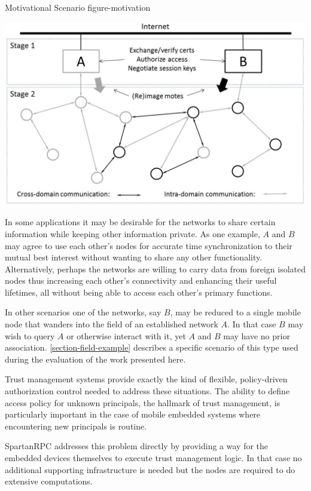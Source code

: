 \begin{fpfig*}[t]
  {Motivational Scenario}
  {figure-motivation}
  \begin{center}
    \includegraphics[scale=.40]{Figures/spartanrpc.eps}
  \end{center}
\end{fpfig*}

In some applications it may be desirable for the networks to share certain information while
keeping other information private. As one example, $A$ and $B$ may agree to use each other's
nodes for accurate time synchronization to their mutual best interest without wanting to share
any other functionality. Alternatively, perhaps the networks are willing to carry data from
foreign isolated nodes thus increasing each other's connectivity and enhancing their useful
lifetimes, all without being able to access each other's primary functions.

In other scenarios one of the networks, say $B$, may be reduced to a single mobile node that
wanders into the field of an established network $A$. In that case $B$ may wish to query $A$ or
otherwise interact with it, yet $A$ and $B$ may have no prior association.
\autoref{section-field-example} describes a specific scenario of this type used during the
evaluation of the work presented here.

Trust management systems provide exactly the kind of flexible, policy-driven authorization
control needed to address these situations. The ability to define access policy for unknown
principals, the hallmark of trust management, is particularly important in the case of mobile
embedded systems where encountering new principals is routine.

SpartanRPC addresses this problem directly by providing a way for the embedded devices
themselves to execute trust management logic. In that case no additional supporting
infrastructure is needed but the nodes are required to do extensive computations.


